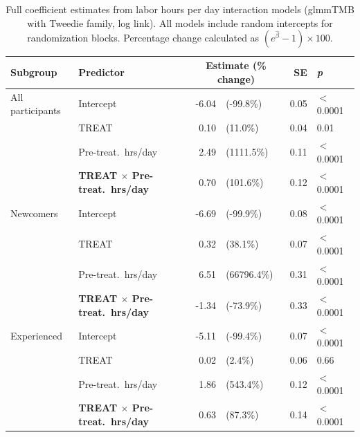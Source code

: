 \begin{table}[ht]
\centering
\small
\caption{Full coefficient estimates from labor hours per day interaction models (glmmTMB with Tweedie family, log link). All models include random intercepts for randomization blocks. Percentage change calculated as $(e^{\hat{\beta}} - 1) \times 100$.}
\label{table:full_labor_perday}
\begin{tabular}{llr@{\hskip 0.5em}lrl}
\toprule
\textbf{Subgroup} & \textbf{Predictor} & \multicolumn{2}{c}{\textbf{Estimate (\% change)}} & \textbf{SE} & \textbf{\textit{p}} \\
\midrule
All participants & Intercept & -6.04 & (-99.8\%) & 0.05 & $<$0.0001 \\
 & TREAT & 0.10 & (11.0\%) & 0.04 & 0.01 \\
 & Pre-treat.\ hrs/day & 2.49 & (1111.5\%) & 0.11 & $<$0.0001 \\
 & \textbf{TREAT $\times$ Pre-treat.\ hrs/day} & 0.70 & (101.6\%) & 0.12 & $<$0.0001 \\
\addlinespace
Newcomers & Intercept & -6.69 & (-99.9\%) & 0.08 & $<$0.0001 \\
 & TREAT & 0.32 & (38.1\%) & 0.07 & $<$0.0001 \\
 & Pre-treat.\ hrs/day & 6.51 & (66796.4\%) & 0.31 & $<$0.0001 \\
 & \textbf{TREAT $\times$ Pre-treat.\ hrs/day} & -1.34 & (-73.9\%) & 0.33 & $<$0.0001 \\
\addlinespace
Experienced & Intercept & -5.11 & (-99.4\%) & 0.07 & $<$0.0001 \\
 & TREAT & 0.02 & (2.4\%) & 0.06 & 0.66 \\
 & Pre-treat.\ hrs/day & 1.86 & (543.4\%) & 0.12 & $<$0.0001 \\
 & \textbf{TREAT $\times$ Pre-treat.\ hrs/day} & 0.63 & (87.3\%) & 0.14 & $<$0.0001 \\
\bottomrule
\end{tabular}
\end{table}
